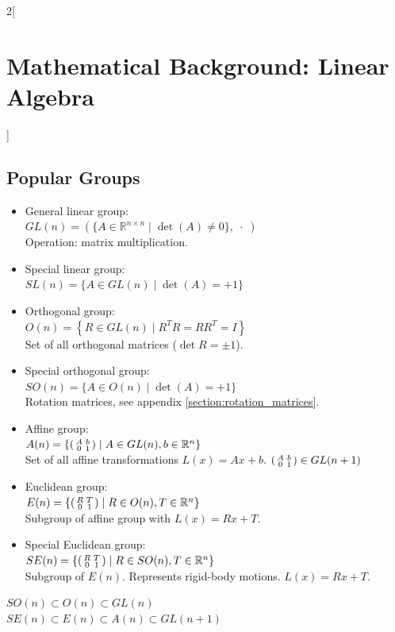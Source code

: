\documentclass[oneside,fontsize=11pt,paper=a4]{scrartcl}
\begin{document}
\begin{multicols}{2}[\section{Mathematical Background: Linear Algebra}]
\subsection{Popular Groups}
\begin{itemize}
    \item General linear group:\\
    $GL(n) = (\{A \in \mathbb{R}^{n \times n} \; \vert \; \det(A) \neq 0\}, \; \cdot \;)$\\
    Operation: matrix multiplication.
    \item Special linear group:\\
    $SL(n) = \{A \in GL(n) \; \vert \; \det(A) = +1\}$
    \item Orthogonal group:\\
    $O(n) = \left\{ R \in GL(n) \; \vert \; R^TR = RR^T = I \right\}$\\
    Set of all orthogonal matrices ($\det R = \pm1$).
    \item Special orthogonal group:\\
    $SO(n) = \{A \in O(n) \; \vert \; \det(A) = +1\}$\\
    Rotation matrices, see appendix \ref{section:rotation_matrices}.
    \item Affine group:\\
    $A(n) = \{\begin{psmallmatrix} A & b\\ 0 & 1\\ \end{psmallmatrix} \; \vert \; A \in GL(n), b \in \mathbb{R}^n\}$\\
    Set of all affine transformations $L(x) = Ax + b$.
	$\begin{psmallmatrix}
		A & b\\
		0 & 1\\
	\end{psmallmatrix}
	\in GL(n+1)$
    \item Euclidean group:\\
    $E(n) = \{\begin{psmallmatrix} R & T\\ 0 & 1\\ \end{psmallmatrix} \; \vert \; R \in O(n), T \in \mathbb{R}^n\}$\\
    Subgroup of affine group with $L(x) = Rx + T$.
    \item Special Euclidean group:\\
    $SE(n) = \{\begin{psmallmatrix} R & T\\ 0 & 1\\ \end{psmallmatrix} \; \vert \; R \in SO(n), T \in \mathbb{R}^n\}$\\
    Subgroup of $E(n)$. Represents rigid-body motions. $L(x) = Rx + T$.
\end{itemize}
$ SO(n) \subset O(n) \subset GL(n)$ \\
$SE(n) \subset E(n) \subset A(n) \subset GL(n+1)$


\end{multicols}
\end{document}
